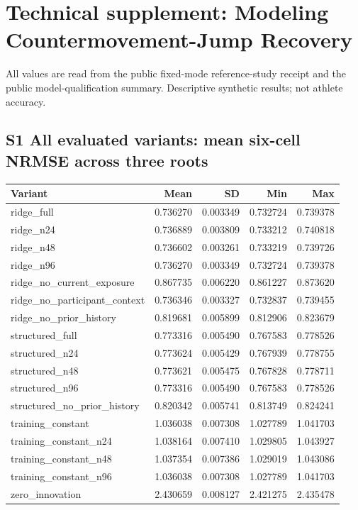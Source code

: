 \documentclass[9pt,a4paper]{extarticle}
\begin{document}
\section*{Technical supplement: Modeling Countermovement-Jump Recovery}
All values are read from the public fixed-mode reference-study receipt and the public model-qualification summary. Descriptive synthetic results; not athlete accuracy.
\subsection*{S1 All evaluated variants: mean six-cell NRMSE across three roots}
\begin{longtable}{lrrrr}
\toprule
Variant & Mean & SD & Min & Max \\
\midrule
\endhead
ridge\_full & 0.736270 & 0.003349 & 0.732724 & 0.739378 \\
ridge\_n24 & 0.736889 & 0.003809 & 0.733212 & 0.740818 \\
ridge\_n48 & 0.736602 & 0.003261 & 0.733219 & 0.739726 \\
ridge\_n96 & 0.736270 & 0.003349 & 0.732724 & 0.739378 \\
ridge\_no\_current\_exposure & 0.867735 & 0.006220 & 0.861227 & 0.873620 \\
ridge\_no\_participant\_context & 0.736346 & 0.003327 & 0.732837 & 0.739455 \\
ridge\_no\_prior\_history & 0.819681 & 0.005899 & 0.812906 & 0.823679 \\
structured\_full & 0.773316 & 0.005490 & 0.767583 & 0.778526 \\
structured\_n24 & 0.773624 & 0.005429 & 0.767939 & 0.778755 \\
structured\_n48 & 0.773621 & 0.005475 & 0.767828 & 0.778711 \\
structured\_n96 & 0.773316 & 0.005490 & 0.767583 & 0.778526 \\
structured\_no\_prior\_history & 0.820342 & 0.005741 & 0.813749 & 0.824241 \\
training\_constant & 1.036038 & 0.007308 & 1.027789 & 1.041703 \\
training\_constant\_n24 & 1.038164 & 0.007410 & 1.029805 & 1.043927 \\
training\_constant\_n48 & 1.037354 & 0.007386 & 1.029019 & 1.043086 \\
training\_constant\_n96 & 1.036038 & 0.007308 & 1.027789 & 1.041703 \\
zero\_innovation & 2.430659 & 0.008127 & 2.421275 & 2.435478 \\
\bottomrule
\end{longtable}
\end{document}
